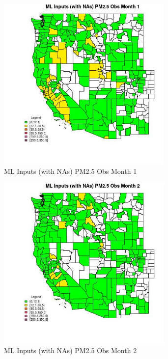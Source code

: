 
\clearpage 

\begin{figure} 
\centering  
\includegraphics[width=0.77\textwidth]{Code_Outputs/Report_ML_input_PM25_Step4_part_e_de_duplicated_aves_compiled_2019-05-20wNAs_CountyPM25_ObsmedianMonth1.jpg} 
\caption{\label{fig:Report_ML_input_PM25_Step4_part_e_de_duplicated_aves_compiled_2019-05-20wNAsCountyPM25_ObsmedianMonth1}ML Inputs (with NAs) PM2.5 Obs Month 1} 
\end{figure} 
 

\begin{figure} 
\centering  
\includegraphics[width=0.77\textwidth]{Code_Outputs/Report_ML_input_PM25_Step4_part_e_de_duplicated_aves_compiled_2019-05-20wNAs_CountyPM25_ObsmedianMonth2.jpg} 
\caption{\label{fig:Report_ML_input_PM25_Step4_part_e_de_duplicated_aves_compiled_2019-05-20wNAsCountyPM25_ObsmedianMonth2}ML Inputs (with NAs) PM2.5 Obs Month 2} 
\end{figure} 
 

